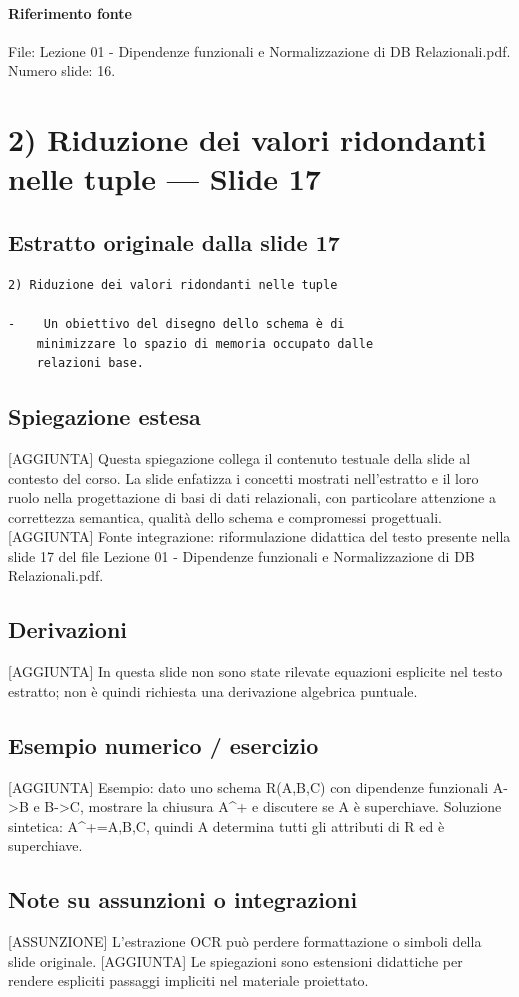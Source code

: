 \documentclass[11pt]{article}
\begin{document}
\paragraph{Riferimento fonte} File: Lezione 01 - Dipendenze funzionali e Normalizzazione di DB Relazionali.pdf. Numero slide: 16.
\section{2) Riduzione dei valori ridondanti nelle tuple --- Slide 17}
\subsection*{Estratto originale dalla slide 17}
\begin{lstlisting}
2) Riduzione dei valori ridondanti nelle tuple

-    Un obiettivo del disegno dello schema è di
    minimizzare lo spazio di memoria occupato dalle
    relazioni base.
\end{lstlisting}
\subsection*{Spiegazione estesa}
[AGGIUNTA] Questa spiegazione collega il contenuto testuale della slide al contesto del corso. La slide enfatizza i concetti mostrati nell'estratto e il loro ruolo nella progettazione di basi di dati relazionali, con particolare attenzione a correttezza semantica, qualità dello schema e compromessi progettuali.
[AGGIUNTA] Fonte integrazione: riformulazione didattica del testo presente nella slide 17 del file Lezione 01 - Dipendenze funzionali e Normalizzazione di DB Relazionali.pdf.
\subsection*{Derivazioni}
[AGGIUNTA] In questa slide non sono state rilevate equazioni esplicite nel testo estratto; non è quindi richiesta una derivazione algebrica puntuale.
\subsection*{Esempio numerico / esercizio}
[AGGIUNTA] Esempio: dato uno schema R(A,B,C) con dipendenze funzionali A->B e B->C, mostrare la chiusura A^+ e discutere se A è superchiave. Soluzione sintetica: A^+={A,B,C}, quindi A determina tutti gli attributi di R ed è superchiave.
\subsection*{Note su assunzioni o integrazioni}
[ASSUNZIONE] L'estrazione OCR può perdere formattazione o simboli della slide originale.
[AGGIUNTA] Le spiegazioni sono estensioni didattiche per rendere espliciti passaggi impliciti nel materiale proiettato.
\end{document}
